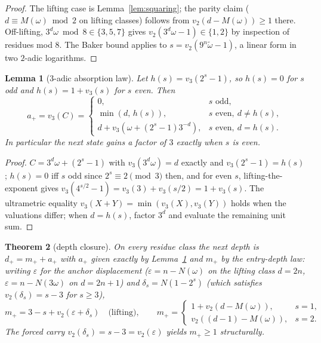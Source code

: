 \documentclass[11pt]{article}
\newtheorem{theorem}{Theorem}[section]
\newtheorem{lemma}[theorem]{Lemma}
\theoremstyle{remark}
\newcommand{\vt}[1]{v_2\!\left(#1\right)}
\newcommand{\vth}[1]{v_3\!\left(#1\right)}
\newcommand{\w}{\omega}
\newcommand{\dnext}{d_{+}}
\begin{document}
\begin{proof}
The lifting case is Lemma~\ref{lem:squaring}; the parity claim ($d \equiv M(\w) \bmod 2$ on lifting classes) follows from $\vt{d - M(\w)} \ge 1$ there. Off-lifting, $3^d\w \bmod 8 \in \{3,5,7\}$ gives $\vt{3^d\w - 1} \in \{1,2\}$ by inspection of residues mod $8$. The Baker bound applies to $s = \vt{9^n\tilde\w - 1}$, a linear form in two $2$-adic logarithms.
\end{proof}

\begin{lemma}[$3$-adic absorption law]\label{lem:absorption}
Let $h(s) = \vth{2^s - 1}$, so $h(s) = 0$ for $s$ odd and $h(s) = 1 + \vth{s}$ for $s$ even. Then
\[ a_+ = \vth{C} = \begin{cases} 0, & s \text{ odd},\\[2pt] \min(d,\, h(s)), & s \text{ even},\ d \ne h(s),\\[2pt] d + \vth{\w + (2^s-1)3^{-d}}, & s \text{ even},\ d = h(s). \end{cases} \]
In particular the next state gains a factor of $3$ exactly when $s$ is even.
\end{lemma}

\begin{proof}
$C = 3^d\w + (2^s - 1)$ with $\vth{3^d\w} = d$ exactly and $\vth{2^s-1} = h(s)$; $h(s) = 0$ iff $s$ odd since $2^s \equiv 2 \pmod 3$ then, and for even $s$, lifting-the-exponent gives $\vth{4^{s/2}-1} = \vth{3} + \vth{s/2} = 1 + \vth{s}$. The ultrametric equality $\vth{X+Y} = \min(\vth X,\vth Y)$ holds when the valuations differ; when $d = h(s)$, factor $3^d$ and evaluate the remaining unit sum.
\end{proof}

\begin{theorem}[depth closure]\label{thm:depth}
On every residue class the next depth is $\dnext = m_+ + a_+$ with $a_+$ given exactly by Lemma~\ref{lem:absorption} and $m_+$ by the \emph{entry-depth law}: writing $\varepsilon$ for the anchor displacement ($\varepsilon = n - N(\w)$ on the lifting class $d = 2n$, $\varepsilon = n - N(3\w)$ on $d = 2n+1$) and $\delta_s = N(1 - 2^s)$ (which satisfies $\vt{\delta_s} = s - 3$ for $s \ge 3$),
\[ m_+ = 3 - s + \vt{\varepsilon + \delta_s} \quad\text{(lifting)},\qquad
   m_+ = \begin{cases} 1 + \vt{d - M(\w)}, & s = 1,\\ \vt{(d-1) - M(\w)}, & s = 2. \end{cases} \]
The forced carry $\vt{\delta_s} = s-3 = \vt{\varepsilon}$ yields $m_+ \ge 1$ structurally.
\end{theorem}
\end{document}
